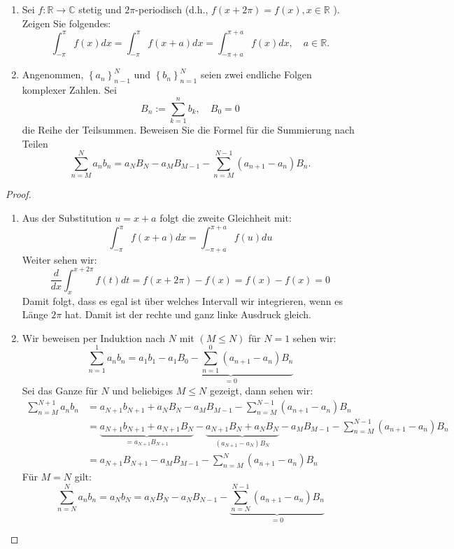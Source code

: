 \documentclass[11pt]{article}
\newenvironment{problem}[2][Beispiel]{
    \begin{trivlist}
        \item[\hskip \labelsep {\bfseries #1}\hskip \labelsep {\bfseries #2.}] \itshape}{
    \end{trivlist}\normalshape
}
\begin{document}
    \begin{problem}{4}
        \begin{enumerate}[label = (\alph*)]
            \item Sei $f: \mathbb{R} \rightarrow \mathbb{C}$ stetig und $2 \pi$-periodisch (d.h., $f(x+2 \pi)=f(x)
            , x \in \mathbb{R}$ ). Zeigen Sie folgendes:
            $$
            \int_{-\pi}^\pi f(x) d x=\int_{-\pi}^\pi f(x+a) d x=\int_{-\pi+a}^{\pi+a} f(x) d x, \quad a \in
            \mathbb{R} .
            $$
            \item Angenommen, $\left\{a_n\right\}_{n-1}^N$ und $\left\{b_n\right\}_{n=1}^N$ seien zwei endliche
            Folgen komplexer Zahlen. Sei
            $$
            B_n:=\sum_{k=1}^n b_k, \quad B_0=0
            $$
            die Reihe der Teilsummen. Beweisen Sie die Formel für die Summierung nach Teilen
            $$
            \sum_{n=M}^N a_n b_n=a_N B_N-a_M B_{M-1}-\sum_{n=M}^{N-1}\left(a_{n+1}-a_n\right) B_n .
            $$
        \end{enumerate}
    \end{problem}

    \begin{proof}
        \begin{enumerate}[label = (\alph*)]
            \item Aus der Substitution $u=x+a$ folgt die zweite Gleichheit mit:
            $$\int_{-\pi}^\pi f(x+a) d x=\int_{-\pi+a}^{\pi+a}f(u)du$$
            Weiter sehen wir:
            $$\frac{d}{dx}\int_{x}^{x+2\pi}f(t)dt = f(x+2\pi)-f(x)=f(x)-f(x)=0$$
            Damit folgt, dass es egal ist über welches Intervall wir integrieren, wenn es Länge $2\pi$ hat.
            Damit ist der rechte und ganz linke Ausdruck gleich.
            \item Wir beweisen per Induktion nach $N$ mit $(M\leq N)$ für $N=1$ sehen wir:
            $$\sum_{n=1}^1 a_n b_n=a_1b_1-\underbrace{a_1 B_{0}-\sum_{n=1}^{0}\left(a_{n+1}-a_n\right) B_n}
            _{=0}$$
            Sei das Ganze für $N$ und beliebiges $M\leq N$ gezeigt, dann sehen wir:
            $$\begin{aligned}
                  \sum_{n=M}^{N+1} a_n b_n
                  &= a_{N+1}b_{N+1} + a_N B_N-a_M B_{M-1}-\sum_{n=M}^{N-1}\left(a_{n+1}-a_n\right) B_n\\
                  &= \underbrace{a_{N+1}b_{N+1}+a_{N+1}B_N}_{=a_{N+1}B_{N+1}}-\underbrace{a_{N+1}B_N +
                  a_N B_N}_{(a_{N+1}-a_N)B_N}-a_M B_{M-1}-\sum_{n=M}^{N-1}\left(a_{n+1}-a_n\right) B_n\\
                  &= a_{N+1} B_{N+1}-a_M B_{M-1}-\sum_{n=M}^{N}\left(a_{n+1}-a_n\right) B_n
            \end{aligned}$$
            Für $M=N$ gilt:
            $$\sum_{n=N}^N a_n b_n=a_Nb_N = a_N B_N-a_N B_{N-1}-\underbrace{\sum_{n=N}^{N-1}\left(a_{n+1}-a_n\right)
            B_n}_{=0}$$
        \end{enumerate}
    \end{proof}
\end{document}
